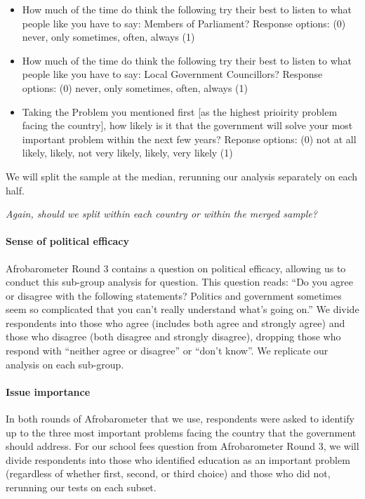 \documentclass[]{article}
\let\oldparagraph\paragraph
\renewcommand{\paragraph}[1]{\oldparagraph{#1}\mbox{}}
\begin{document}
\begin{itemize}
  \item How much of the time do think the following try their best to listen to what people like you have to say: Members of Parliament? Response options: (0) never, only sometimes, often, always (1)
  \item How much of the time do think the following try their best to listen to what people like you have to say: Local Government Councillors? Response options: (0) never, only sometimes, often, always (1)
  \item Taking the Problem you mentioned first [as the highest prioirity problem facing the country], how likely is it that the government will solve your most important problem within the next few years? Reponse options: (0) not at all likely, likely, not very likely, likely, very likely (1)
\end{itemize}

We will split the sample at the median, rerunning our analysis
separately on each half.

\textit{Again, should we split within each country or within the merged sample?}

\paragraph{Sense of political
efficacy}\label{sense-of-political-efficacy}

Afrobarometer Round 3 contains a question on political efficacy,
allowing us to conduct this sub-group analysis for question. This
question reads: ``Do you agree or disagree with the following
statements? Politics and government sometimes seem so complicated that
you can't really understand what's going on.'' We divide respondents
into those who agree (includes both agree and strongly agree) and those
who disagree (both disagree and strongly disagree), dropping those who
respond with ``neither agree or disagree'' or ``don't know''. We
replicate our analysis on each sub-group.

\paragraph{Issue importance}\label{issue-importance}

In both rounds of Afrobarometer that we use, respondents were asked to
identify up to the three most important problems facing the country that
the government should address. For our school fees question from
Afrobarometer Round 3, we will divide respondents into those who
identified education as an important problem (regardless of whether
first, second, or third choice) and those who did not, rerunning our
tests on each subset.
\end{document}
